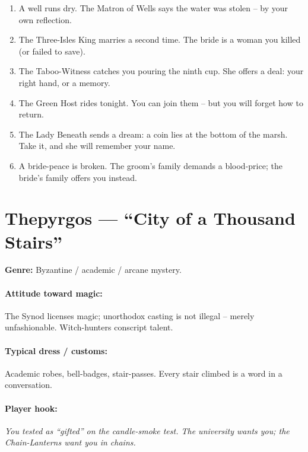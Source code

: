 \begin{tcolorbox}[colback=gray!5!white, colframe=gray!70!black, title=Theona Mini-Generator (d6),breakable]
\begin{enumerate}
\item A well runs dry. The Matron of Wells says the water was stolen -- by your own reflection.
\item The Three-Isles King marries a second time. The bride is a woman you killed (or failed to save).
\item The Taboo-Witness catches you pouring the ninth cup. She offers a deal: your right hand, or a memory.
\item The Green Host rides tonight. You can join them -- but you will forget how to return.
\item The Lady Beneath sends a dream: a coin lies at the bottom of the marsh. Take it, and she will remember your name.
\item A bride-peace is broken. The groom's family demands a blood-price; the bride's family offers you instead.
\end{enumerate}
\end{tcolorbox}

\section{Thepyrgos --- ``City of a Thousand Stairs''}
\textbf{Genre:} Byzantine / academic / arcane mystery.

\paragraph{Attitude toward magic:} The Synod licenses magic; unorthodox casting is not illegal -- merely unfashionable. Witch-hunters conscript talent.

\paragraph{Typical dress / customs:} Academic robes, bell-badges, stair-passes. Every stair climbed is a word in a conversation.

\paragraph{Player hook:} \emph{You tested as ``gifted'' on the candle-smoke test. The university wants you; the Chain-Lanterns want you in chains.}

